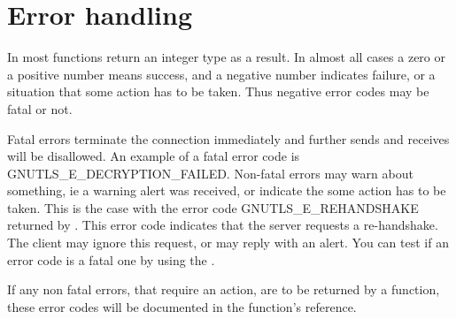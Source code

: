 \section{Error handling}
\par
In \gnutls{} most functions return an integer type as a result.
In almost all cases a zero or a positive number means success, and
a negative number indicates failure, or a situation that some
action has to be taken. Thus negative error codes may be fatal
or not. 
\par 
Fatal errors terminate the connection immediately and
further sends and receives will be disallowed. An example of
a fatal error code is GNUTLS\_E\_DECRYPTION\_FAILED. Non-fatal errors
may warn about something, ie a warning alert was received, or
indicate the some action has to be taken. This is the case with
the error code GNUTLS\_E\_REHANDSHAKE returned by 
.
This error code indicates that the server requests a re-handshake. The client
may ignore this request, or may reply with an alert.
You can test if an error code is a fatal one by using the
.
\par
If any non fatal errors, that require an action, are to be returned by a
function, these error codes will be documented
in the function's reference.

